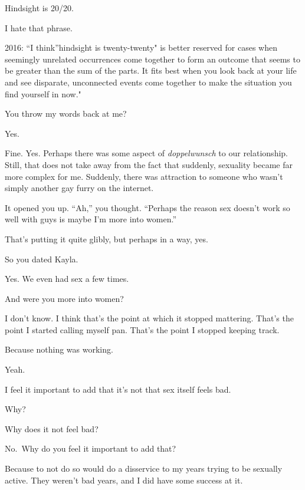 \begin{leftcolumn}
\begin{ally}
Hindsight is 20/20.
\end{ally}
I hate that phrase.

\begin{ally}
2016: ``I think''hindsight is twenty-twenty" is better reserved for cases when seemingly unrelated occurrences come together to form an outcome that seems to be greater than the sum of the parts. It fits best when you look back at your life and see disparate, unconnected events come together to make the situation you find yourself in now."
\end{ally}
You throw my words back at me?

\begin{ally}
Yes.
\end{ally}
Fine. Yes. Perhaps there was some aspect of \emph{doppelwunsch} to our relationship. Still, that does not take away from the fact that suddenly, sexuality became far more complex for me. Suddenly, there was attraction to someone who wasn't simply another gay furry on the internet.

\begin{ally}
It opened you up. ``Ah,'' you thought. ``Perhaps the reason sex doesn't work so well with guys is maybe I'm more into women.''
\end{ally}
That's putting it quite glibly, but perhaps in a way, yes.

\begin{ally}
So you dated Kayla.
\end{ally}
Yes. We even had sex a few times.

\begin{ally}
And were you more into women?
\end{ally}
I don't know. I think that's the point at which it stopped mattering. That's the point I started calling myself pan. That's the point I stopped keeping track.

\begin{ally}
Because nothing was working.
\end{ally}
Yeah.
\newpage

I feel it important to add that it's not that sex itself feels bad.

\begin{ally}
Why?
\end{ally}
Why does it not feel bad?

\begin{ally}
No.~Why do you feel it important to add that?
\end{ally}
Because to not do so would do a disservice to my years trying to be sexually active. They weren't bad years, and I did have some success at it.


\end{leftcolumn}
